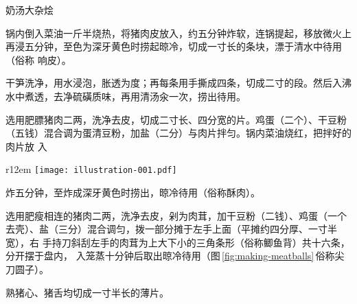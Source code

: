 \begin{recipe}{奶汤大杂烩}

\ingredients


\preparation

\step 锅内倒入菜油一斤半烧热，将猪肉皮放入，约五分钟炸软，连锅提起，移放微火上
再浸五分钟，至色为深牙黄色时捞起晾冷，切成一寸长的条块，漂于清水中待用（俗称
响皮）。

\step 干笋洗净，用水浸泡，胀透为度；再每条用手撕成四条，切成二寸的段。然后入沸
水中煮透，去净硫磺质味，再用清汤汆一次，捞出待用。

\step 选用肥膘猪肉二两，洗净去皮，切成二寸长、四分宽的片。鸡蛋（二个）、干豆粉
（五钱）混合调为蛋清豆粉，加盐（二分）与肉片拌匀。锅内菜油烧红，把拌好的肉片放
入
\begin{wrapfigure}[9]{r}{12em}%
\centering%
\vspace{.3125\baselineskip}%
\quad\texttt{[image: illustration-001.pdf]}%
\vspace{-.1875\baselineskip}%
\caption{尖刀圆子做法}
\label{fig:making-meatballs}
\end{wrapfigure}%
%
炸五分钟，至炸成深牙黄色时捞出，晾冷待用（俗称酥肉）。

\step 选用肥瘦相连的猪肉二两，洗净去皮，剁为肉茸，加干豆粉（二钱）、鸡蛋（一个
去壳）、盐（三分）混合调匀，拨一部分摊于左手上面（平摊约四分厚、一寸半宽），右
手持刀斜刮左手的肉茸为上大下小的三角条形（俗称鲫鱼背）共十六条，分开摆于盘内，
入笼蒸十分钟后取出晾冷待用（图\,\ref{fig:making-meatballs}\,俗称尖刀圆子）。

\step 熟猪心、猪舌均切成一寸半长的薄片。


\end{recipe}
